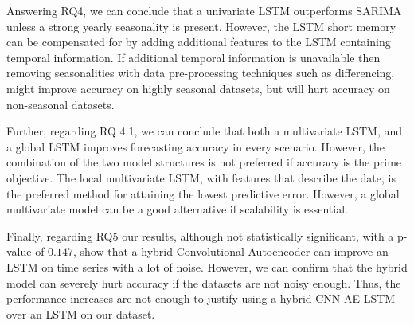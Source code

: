 Answering RQ4, we can conclude that a univariate LSTM outperforms SARIMA
unless a strong yearly seasonality is present. However, the LSTM short memory can be
compensated for by adding additional features to the LSTM containing temporal information.
If additional temporal information is unavailable then removing seasonalities with data pre-processing techniques such as differencing,
might improve accuracy on highly seasonal datasets, but will hurt accuracy on non-seasonal datasets.

Further, regarding RQ 4.1, we can conclude that both a multivariate LSTM,
and a global LSTM improves forecasting accuracy in every scenario.
However, the combination of the two model structures is not preferred if accuracy is the prime objective.
The local multivariate LSTM, with features that describe the date, is the preferred method for attaining the lowest predictive error.
However, a global multivariate model can be a good alternative if scalability is essential.

Finally, regarding RQ5  our results,
although not statistically significant, with a p-value of $0.147$,
show that a hybrid Convolutional Autoencoder can improve an LSTM on time series
with a lot of noise.
However, we can confirm that the hybrid model can severely
hurt accuracy if the datasets are not noisy enough.
Thus, the performance increases are not enough to justify using
a hybrid CNN-AE-LSTM over an LSTM on our dataset.



